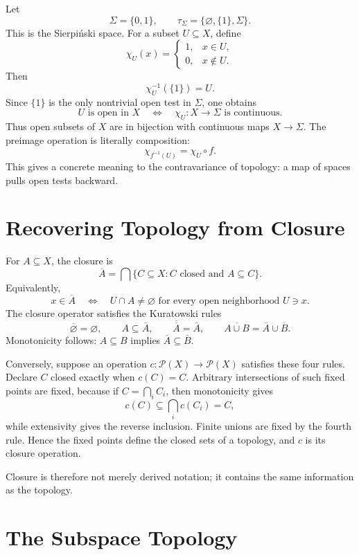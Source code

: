 Let
\[
  \Sigma=\{0,1\},
  \qquad
  \tau_\Sigma=\{\varnothing,\{1\},\Sigma\}.
\]
This is the Sierpiński space.  For a subset \(U\subseteq X\), define
\[
  \chi_U(x)=
  \begin{cases}
  1,&x\in U,\\
  0,&x\notin U.
  \end{cases}
\]
Then
\[
  \chi_U^{-1}(\{1\})=U.
\]
Since \(\{1\}\) is the only nontrivial open test in \(\Sigma\), one obtains
\[
  \boxed{
  U\text{ is open in }X
  \quad\Longleftrightarrow\quad
  \chi_U:X\to\Sigma\text{ is continuous}.}
\]
Thus open subsets of \(X\) are in bijection with continuous maps \(X\to\Sigma\).  The preimage operation is literally composition:
\[
  \chi_{f^{-1}(U)}=\chi_U\circ f.
\]
This gives a concrete meaning to the contravariance of topology: a map of spaces pulls open tests backward.

\section{Recovering Topology from Closure}

For \(A\subseteq X\), the closure is
\[
  \overline A
  =\bigcap\{C\subseteq X:C\text{ closed and }A\subseteq C\}.
\]
Equivalently,
\[
  x\in\overline A
  \quad\Longleftrightarrow\quad
  U\cap A\ne\varnothing
  \text{ for every open neighborhood }U\ni x.
\]
The closure operator satisfies the Kuratowski rules
\[
  \overline\varnothing=\varnothing,
  \qquad
  A\subseteq\overline A,
  \qquad
  \overline{\overline A}=\overline A,
  \qquad
  \overline{A\cup B}=\overline A\cup\overline B.
\]
Monotonicity follows: \(A\subseteq B\) implies \(\overline A\subseteq\overline B\).

Conversely, suppose an operation \(c:\mathcal P(X)\to\mathcal P(X)\) satisfies these four rules.  Declare \(C\) closed exactly when \(c(C)=C\).  Arbitrary intersections of such fixed points are fixed, because if \(C=\bigcap_i C_i\), then monotonicity gives
\[
  c(C)\subseteq\bigcap_i c(C_i)=C,
\]
while extensivity gives the reverse inclusion.  Finite unions are fixed by the fourth rule.  Hence the fixed points define the closed sets of a topology, and \(c\) is its closure operation.

Closure is therefore not merely derived notation; it contains the same information as the topology.

\section{The Subspace Topology}

